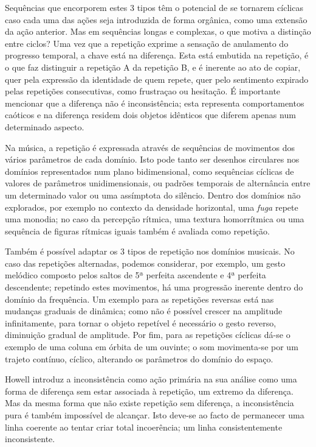 \documentclass[../main.tex]{subfiles}
\begin{document}
Sequências que encorporem estes 3 tipos têm o potencial de se tornarem cíclicas caso cada uma das ações seja introduzida de forma orgânica, como uma extensão da ação anterior. Mas em sequências longas e complexas, o que motiva a distinção entre ciclos? Uma vez que a repetição exprime a sensação de anulamento do progresso temporal, a chave está na diferença. Esta está embutida na repetição, é o que faz distinguir a repetição A da repetição B, e é inerente ao ato de copiar, quer pela expressão da identidade de quem repete, quer pelo sentimento expirado pelas repetições consecutivas, como frustraçao ou hesitação. É importante mencionar que a diferença não é inconsistência; esta representa comportamentos caóticos e na diferença residem dois objetos idênticos que diferem apenas num determinado aspecto.

Na música, a repetição é expressada através de sequências de movimentos dos vários parâmetros de cada domínio. Isto pode tanto ser desenhos circulares nos domínios representados num plano bidimensional, como sequências cíclicas de valores de parâmetros unidimensionais, ou padrões temporais de alternância entre um determinado valor ou uma assímptota do silêncio. Dentro dos domínios não explorados, por exemplo no contexto da densidade horizontal, uma \textsl{fuga} repete uma monodia; no caso da percepção rítmica, uma textura homorrítmica ou uma sequência de figuras rítmicas iguais também é avaliada como repetição.

Também é possível adaptar os 3 tipos de repetição nos domínios musicais. No caso das repetições alternadas, podemos considerar, por exemplo, um gesto melódico composto pelos saltos de 5ª perfeita ascendente e 4ª perfeita descendente; repetindo estes movimentos, há uma progressão inerente dentro do domínio da frequência. Um exemplo para as repetições reversas está nas mudanças graduais de dinâmica; como não é possível crescer na amplitude infinitamente, para tornar o objeto repetível é necessário o gesto reverso, diminuição gradual de amplitude. Por fim, para as repetições cíclicas dá-se o exemplo de uma coluna em órbita de um ouvinte; o som movimenta-se por um trajeto contínuo, cíclico, alterando os parâmetros do domínio do espaço.


Howell introduz a inconsistência como ação primária na sua análise como uma forma de diferença sem estar associada à repetição, um extremo da diferença\cite{howell1999}. Mas da mesma forma que não existe repetição sem diferença, a inconsistência pura é também impossível de alcançar. Isto deve-se ao facto de permanecer uma linha coerente ao tentar criar total incoerência; um linha consistentemente inconsistente.
\end{document}
